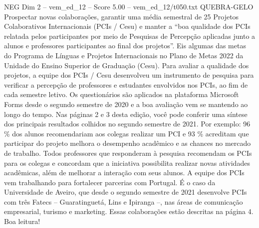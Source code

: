 \begin{textsample}{NEG Dim 2 – vem\_ed\_12 – Score 5.00 – vem\_ed\_12/t050.txt}  \label{ex:f2_neg_076}
QUEBRA-GELO Prospectar novas colaborações, garantir uma média semestral de 25 Projetos Colaborativos Internacionais (PCIs / Cesu) e manter a “boa qualidade dos PCIs relatada pelos participantes por meio de Pesquisas de Percepção aplicadas junto a alunos e professores participantes ao final dos projetos”.
Eis algumas das metas do Programa de Línguas e Projetos Internacionais no Plano de Metas 2022 da Unidade do Ensino Superior de Graduação (Cesu).
Para avaliar a qualidade dos projetos, a equipe dos PCIs / Cesu desenvolveu um instrumento de pesquisa para verificar a percepção de professores e estudantes envolvidos nos PCIs, ao fim de cada semestre letivo.
Os questionários são aplicados na plataforma Microsoft Forms desde o segundo semestre de 2020 e a boa avaliação vem se mantendo ao longo do tempo.
Nas páginas 2 e 3 desta edição, você pode conferir uma síntese dos principais resultados colhidos no segundo semestre de 2021.
Por exemplo: 96 \% dos alunos recomendariam aos colegas realizar um PCI e 93 \% acreditam que participar do projeto melhora o desempenho acadêmico e as chances no mercado de trabalho.
Todos professores que responderam à pesquisa recomendam os PCIs para os colegas e concordam que a iniciativa possibilita realizar novas atividades acadêmicas, além de melhorar a interação com seus alunos.
A equipe dos PCIs vem trabalhando para fortalecer parcerias com Portugal.
É o caso da Universidade de Aveiro, que desde o segundo semestre de 2021 desenvolve PCIs com três Fatecs – Guaratinguetá, Lins e Ipiranga –, nas áreas de comunicação empresarial, turismo e marketing.
Essas colaborações estão descritas na página 4.
Boa leitura!

\end{textsample}
